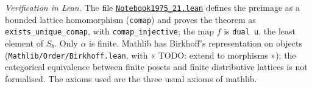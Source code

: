 \emph{Verification in Lean.} The file \href{\leanblobmain/Notebook1975_21.lean}{\texttt{Notebook1975\_21.\allowbreak{}lean}} defines the preimage as a bounded lattice homomorphism (\texttt{comap}) and proves the theorem as \texttt{exists\_unique\_comap}, with \texttt{comap\_injective}; the map $f$ is \texttt{dual u}, the least element of $S_b$. Only $\alpha$ is finite. Mathlib has Birkhoff's representation on objects (\texttt{Mathlib/Order/Birkhoff.lean}, with « TODO: extend to morphisms »); the categorical equivalence between finite posets and finite distributive lattices is not formalised. The axioms used are the three usual axioms of mathlib.


